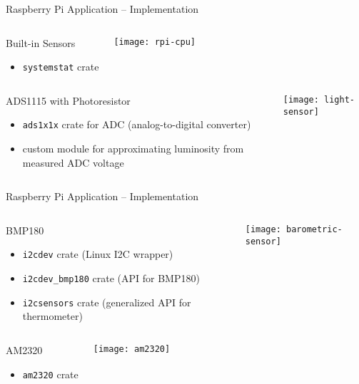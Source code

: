 \begin{frame}{Raspberry Pi Application -- Implementation}
  \begin{columns}
    \begin{block}{Built-in Sensors}
      \begin{itemize}
        \item \texttt{systemstat} crate
      \end{itemize}
    \end{block}

    \vfill
    \centering
    \texttt{[image: rpi-cpu]}
  \end{columns}

  \begin{columns}
    \begin{block}{ADS1115 with Photoresistor}
      \begin{itemize}
        \item \texttt{ads1x1x} crate for ADC (analog-to-digital converter)
        \item custom module for approximating luminosity from measured ADC voltage
      \end{itemize}
    \end{block}

    \vfill
    \centering
    \texttt{[image: light-sensor]}
  \end{columns}
\end{frame}

\begin{frame}{Raspberry Pi Application -- Implementation}
  \begin{columns}
    \begin{block}{BMP180}
      \begin{itemize}
        \item \texttt{i2cdev} crate (Linux I2C wrapper)
        \item \texttt{i2cdev\_bmp180} crate (API for BMP180)
        \item \texttt{i2csensors} crate (generalized API for thermometer)
      \end{itemize}
    \end{block}

    \vfill
    \centering
    \texttt{[image: barometric-sensor]}
  \end{columns}

  \begin{columns}
    \begin{block}{AM2320}
      \begin{itemize}
        \item \texttt{am2320} crate
      \end{itemize}
    \end{block}

    \vfill
    \centering
    \texttt{[image: am2320]}
  \end{columns}
\end{frame}

